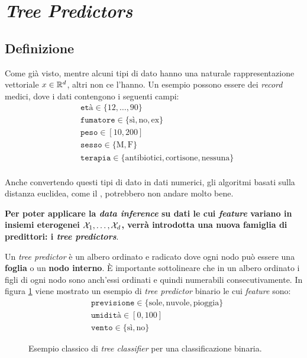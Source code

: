 \section{\textit{Tree Predictors}}

\subsection{Definizione}
Come già visto, mentre alcuni tipi di dato hanno una naturale rappresentazione
vettoriale $x \in \mathbb{R}^d$, altri non ce l'hanno. Un esempio possono essere dei
\textit{record} medici, dove i dati contengono i seguenti campi:
$$ \begin{aligned}
    &\texttt{età} \in \{12,\dots,90\} \\
    &\texttt{fumatore} \in \{\text{sì},\text{no},\text{ex}\} \\
    &\texttt{peso} \in [10,200] \\
    &\texttt{sesso} \in \{\text{M},\text{F}\} \\
    &\texttt{terapia} \in \{\text{antibiotici},\text{cortisone},\text{nessuna}\} \\
\end{aligned} $$

Anche convertendo questi tipi di dato in dati numerici, gli algoritmi basati sulla
distanza euclidea, come il \kNN, potrebbero non andare molto bene.

\textbf{Per poter applicare la \textit{data inference} su dati le cui 
\textit{feature} variano in insiemi eterogenei $\mathcal{X}_1,\dots,\mathcal{X}_d$, verrà introdotta 
una nuova famiglia di predittori: i \textit{tree predictors}}.

Un \textit{tree predictor} è un albero ordinato e radicato dove ogni nodo può
essere una \textbf{foglia} o un \textbf{nodo interno}. È importante sottolineare che
in un albero ordinato i figli di ogni nodo sono anch'essi ordinati e quindi numerabili
consecutivamente.
In figura \ref{fig:tree_class}
viene mostrato un esempio di \textit{tree predictor} binario le cui \textit{feature}
sono:
$$ \begin{aligned}
    &\texttt{previsione} \in \{\text{sole},\text{nuvole},\text{pioggia}\} \\
    &\texttt{umidità} \in [0,100] \\
    &\texttt{vento} \in \{\text{sì},\text{no}\}
\end{aligned} $$
 
\begin{figure}[h]
    \centering
    
    \caption{Esempio classico di \textit{tree classifier} per una classificazione
    binaria.\label{fig:tree_class}}
\end{figure}

